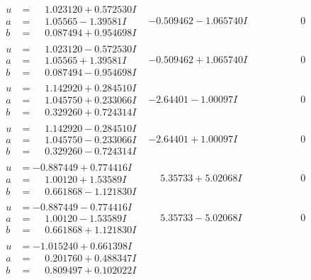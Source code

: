\documentclass[1p]{elsarticle_modified}
\theoremstyle{definition}
\begin{document}
$$\begin{array}{c|c|c}
\begin{aligned}
u &= \phantom{-}1.023120 + 0.572530 I \\
a &= \phantom{-}1.05565 - 1.39581 I \\
b &= \phantom{-}0.087494 + 0.954698 I\end{aligned}
 & -0.509462 - 1.065740 I & \phantom{-0.000000 } 0 \\ \hline\begin{aligned}
u &= \phantom{-}1.023120 - 0.572530 I \\
a &= \phantom{-}1.05565 + 1.39581 I \\
b &= \phantom{-}0.087494 - 0.954698 I\end{aligned}
 & -0.509462 + 1.065740 I & \phantom{-0.000000 } 0 \\ \hline\begin{aligned}
u &= \phantom{-}1.142920 + 0.284510 I \\
a &= \phantom{-}1.045750 + 0.233066 I \\
b &= \phantom{-}0.329260 + 0.724314 I\end{aligned}
 & -2.64401 - 1.00097 I & \phantom{-0.000000 } 0 \\ \hline\begin{aligned}
u &= \phantom{-}1.142920 - 0.284510 I \\
a &= \phantom{-}1.045750 - 0.233066 I \\
b &= \phantom{-}0.329260 - 0.724314 I\end{aligned}
 & -2.64401 + 1.00097 I & \phantom{-0.000000 } 0 \\ \hline\begin{aligned}
u &= -0.887449 + 0.774416 I \\
a &= \phantom{-}1.00120 + 1.53589 I \\
b &= \phantom{-}0.661868 - 1.121830 I\end{aligned}
 & \phantom{-}5.35733 + 5.02068 I & \phantom{-0.000000 } 0 \\ \hline\begin{aligned}
u &= -0.887449 - 0.774416 I \\
a &= \phantom{-}1.00120 - 1.53589 I \\
b &= \phantom{-}0.661868 + 1.121830 I\end{aligned}
 & \phantom{-}5.35733 - 5.02068 I & \phantom{-0.000000 } 0 \\ \hline\begin{aligned}
u &= -1.015240 + 0.661398 I \\
a &= \phantom{-}0.201760 + 0.488347 I \\
b &= \phantom{-}0.809497 + 0.102022 I\end{aligned}

\end{array}$$
\end{document}
